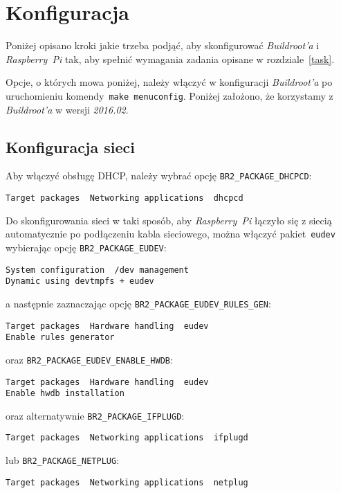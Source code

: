 \documentclass{article}
\begin{document}
\section{Konfiguracja}

Poniżej opisano kroki jakie trzeba podjąć, aby skonfigurować \emph{Buildroot'a} i \emph{Raspberry~Pi} tak, aby spełnić wymagania zadania opisane w rozdziale~\ref{task}.

Opcje, o których mowa poniżej, należy włączyć w konfiguracji \emph{Buildroot'a} po uruchomieniu komendy~\texttt{make menuconfig}. Poniżej założono, że korzystamy z \emph{Buildroot'a} w wersji \emph{2016.02}.


\subsection{Konfiguracja sieci}

Aby włączyć obsługę DHCP, należy wybrać opcję \texttt{BR2\_PACKAGE\_DHCPCD}:
\begin{center}
\texttt{Target packages \textrightarrow\ Networking applications \textrightarrow\ dhcpcd}
\end{center}

\noindent Do skonfigurowania sieci w taki sposób, aby \emph{Raspberry~Pi} łączyło się z siecią automatycznie po podłączeniu kabla sieciowego, można włączyć pakiet~\texttt{eudev} wybierając opcję \texttt{BR2\_PACKAGE\_EUDEV}:
\begin{center}
\texttt{System configuration \textrightarrow\ /dev management\ \textrightarrow\\Dynamic using devtmpfs + eudev}
\end{center}
a następnie zaznaczając opcję \texttt{BR2\_PACKAGE\_EUDEV\_RULES\_GEN}:
\begin{center}
\texttt{Target packages \textrightarrow\ Hardware handling \textrightarrow\ eudev \textrightarrow\\Enable rules generator}
\end{center}
oraz \texttt{BR2\_PACKAGE\_EUDEV\_ENABLE\_HWDB}:
\begin{center}
\texttt{Target packages \textrightarrow\ Hardware handling \textrightarrow\ eudev \textrightarrow\\Enable hwdb installation}
\end{center}
oraz alternatywnie \texttt{BR2\_PACKAGE\_IFPLUGD}:
\begin{center}
\texttt{Target packages \textrightarrow\ Networking applications \textrightarrow\ ifplugd}
\end{center}
lub \texttt{BR2\_PACKAGE\_NETPLUG}:
\begin{center}
\texttt{Target packages \textrightarrow\ Networking applications \textrightarrow\ netplug}
\end{center}
\end{document}
